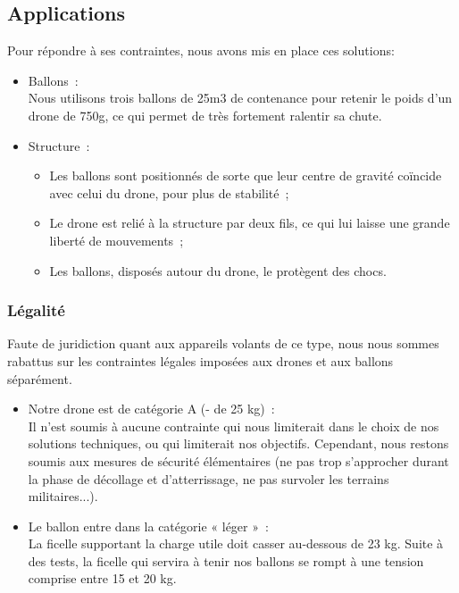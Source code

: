 \documentclass[a4paper,11pt]{article}
\begin{document}
\subsection{Applications}
Pour répondre à ses contraintes, nous avons mis en place ces solutions:
\begin{itemize}
	\item Ballons~:\\
		Nous utilisons trois ballons de 25m3 de contenance pour retenir le poids d'un drone de 750g, ce qui permet de très fortement ralentir sa chute.
	\item Structure~:
		\begin{itemize}
			\item Les ballons sont positionnés de sorte que leur centre de gravité coïncide avec celui du drone, pour plus de stabilité~;
			\item Le drone est relié à la structure par deux fils, ce qui lui laisse une grande liberté de mouvements~;
			\item Les ballons, disposés autour du drone, le protègent des chocs.
		\end{itemize}
\end{itemize}


\subsubsection{Légalité}
Faute de juridiction quant aux appareils volants de ce type, nous nous sommes rabattus sur les contraintes légales imposées aux drones et aux ballons séparément.\\
\begin{itemize}
	\item Notre drone est de catégorie A (- de 25 kg)~:\\
		Il n'est soumis à aucune contrainte qui nous limiterait dans le choix de nos solutions techniques, ou qui limiterait nos objectifs.
		Cependant, nous restons soumis aux mesures de sécurité élémentaires (ne pas trop s'approcher durant la phase de décollage et d'atterrissage, ne pas survoler les terrains militaires...).
	\item Le ballon entre dans la catégorie « léger »~:\\
		La ficelle supportant la charge utile doit casser au-dessous de 23 kg.
		Suite à des tests, la ficelle qui servira à tenir nos ballons se rompt à une tension comprise entre 15 et 20 kg.
\end{itemize}
\end{document}
